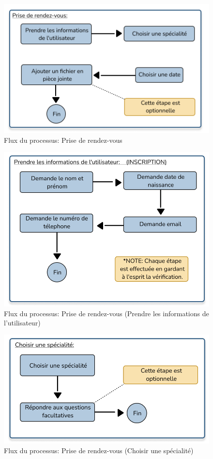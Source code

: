 \begin{figure}[H] 
    \centering
    \includegraphics[scale=0.8]{Figures/cbf_rdv.png}
    \caption{Flux du processus: Prise de rendez-vous}
\end{figure}


\begin{figure}[H] 
    \centering
    \includegraphics[scale=0.8]{Figures/cbf_user.png}
    \caption{Flux du processus: Prise de rendez-vous (Prendre les informations de l'utilisateur)}
\end{figure}


\begin{figure}[H] 
    \centering
    \includegraphics[scale=0.9]{Figures/cbf_specialite.png}
    \caption{Flux du processus: Prise de rendez-vous (Choisir une spécialité)}
\end{figure}


